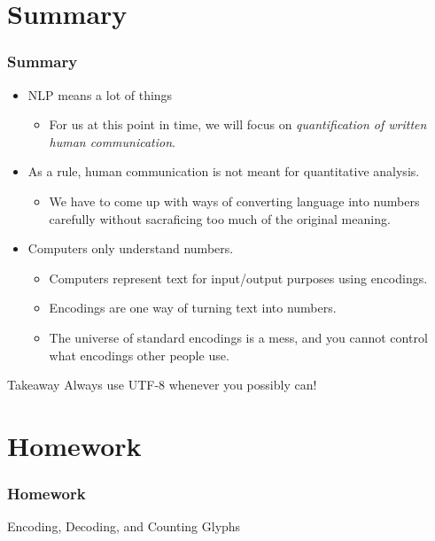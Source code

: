 \documentclass[smaller,xcolor=table,aspectratio=169]{beamer}
\begin{document}
\section*{Summary}

\begin{frame}
  \frametitle{Summary}
  \begin{itemize}
    \item NLP means a lot of things
    \begin{itemize}
      \item For us at this point in time, we will focus on {\itshape quantification of written human communication}.
    \end{itemize}
    \item As a rule, human communication is not meant for quantitative analysis.
    \begin{itemize}
      \item We have to come up with ways of converting language into numbers carefully without sacraficing too much of the original meaning.
    \end{itemize}
    \item Computers only understand numbers.
    \begin{itemize}
      \item Computers represent text for input/output purposes using encodings.
      \item Encodings are one way of turning text into numbers.
      \item The universe of standard encodings is a mess, and you cannot control what encodings other people use.
    \end{itemize}
  \end{itemize}
  \begin{alertblock}{Takeaway}
    Always use UTF-8 whenever you possibly can!
  \end{alertblock}
\end{frame}

\section*{Homework}

\begin{frame}
  \frametitle{Homework}
  Encoding, Decoding, and Counting Glyphs
\end{frame}
\end{document}
